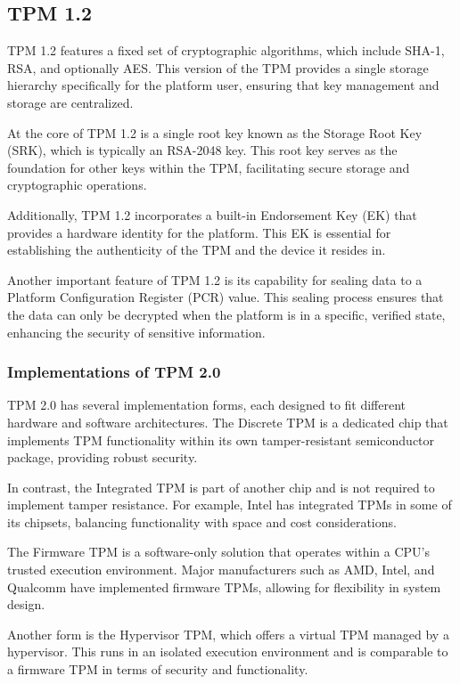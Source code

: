 \subsection{TPM 1.2}

TPM 1.2 features a fixed set of cryptographic algorithms, which
include SHA-1, RSA, and optionally AES. This version of the TPM
provides a single storage hierarchy specifically for the platform
user, ensuring that key management and storage are centralized.

At the core of TPM 1.2 is a single root key known as the Storage Root
Key (SRK), which is typically an RSA-2048 key. This root key serves as
the foundation for other keys within the TPM, facilitating secure
storage and cryptographic operations.

Additionally, TPM 1.2 incorporates a built-in Endorsement Key (EK)
that provides a hardware identity for the platform. This EK is
essential for establishing the authenticity of the TPM and the device
it resides in. 

Another important feature of TPM 1.2 is its capability for sealing
data to a Platform Configuration Register (PCR) value. This sealing
process ensures that the data can only be decrypted when the platform
is in a specific, verified state, enhancing the security of sensitive
information.

\subsubsection{Implementations of TPM 2.0}

TPM 2.0 has several implementation forms, each designed to fit
different hardware and software architectures. The Discrete TPM is a
dedicated chip that implements TPM functionality within its own
tamper-resistant semiconductor package, providing robust security.

In contrast, the Integrated TPM is part of another chip and is not
required to implement tamper resistance. For example, Intel has
integrated TPMs in some of its chipsets, balancing functionality with
space and cost considerations.

The Firmware TPM is a software-only solution that operates within a
CPU's trusted execution environment. Major manufacturers such as AMD,
Intel, and Qualcomm have implemented firmware TPMs, allowing for
flexibility in system design.

Another form is the Hypervisor TPM, which offers a virtual TPM managed
by a hypervisor. This runs in an isolated execution environment and is
comparable to a firmware TPM in terms of security and functionality.

